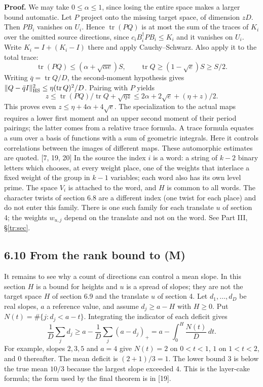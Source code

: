 \documentclass[11pt,letterpaper]{article}
\begin{document}
{\textbf{Proof.} We may take $0\le\alpha\le1$, since losing the entire space makes a larger bound automatic. Let $P$ project onto the missing target space, of dimension $zD$. Then $PB_i$ vanishes on $U_i$. Hence $\operatorname{tr}(PQ)$ is at most the sum of the traces of $K_i$ over the omitted source directions, since $c_iB_i^\dagger PB_i\le K_i$ and it vanishes on $U_i$. Write $K_i=I+(K_i-I)$ there and apply Cauchy--Schwarz. Also apply it to the total trace:
\begin{equation}\label{D:106}
 \operatorname{tr}(PQ)\le(\alpha+\sqrt{\alpha e})S,\qquad
 \operatorname{tr}Q\ge (1-\sqrt e)S\ge S/2 .
\end{equation}
Writing $\bar q=\operatorname{tr}Q/D$, the second-moment hypothesis gives $\|Q-\bar q I\|_{\rm HS}^2\le\eta(\operatorname{tr}Q)^2/D$. Pairing with $P$ yields
\begin{equation}\label{D:107}
 z\le\operatorname{tr}(PQ)/\operatorname{tr}Q+\sqrt{\eta z}
   \le 2\alpha+2\sqrt e+(\eta+z)/2.
\end{equation}
This proves even $z\le\eta+4\alpha+4\sqrt e$. The specialization to the actual maps requires a lower first moment and an upper second moment of their period pairings; the latter comes from a relative trace formula. A trace formula equates a sum over a basis of functions with a sum of geometric integrals. Here it controls correlations between the images of different maps. These automorphic estimates are quoted. [7, 19, 20] In the source the index $i$ is a word: a string of $k-2$ binary letters which chooses, at every weight place, one of the weights that interlace a fixed weight of the group in $k-1$ variables; each word also has its own level prime. The space $V_i$ is attached to the word, and $H$ is common to all words. The character twists of section 6.8 are a different index (one twist for each place) and do not enter this family. There is one such family for each translate $u$ of section 4; the weights $w_{u,j}$ depend on the translate and not on the word. See Part III, \S\ref{tr:sec}.

\newpage
\subsection*{6.10 From the rank bound to (M)}

It remains to see why a count of directions can control a mean slope. In this section $H$ is a bound for heights and $u$ is a spread of slopes; they are not the target space $H$ of section 6.9 and the translate $u$ of section 4. Let $d_1,\ldots,d_D$ be real slopes, $a$ a reference value, and assume $d_j\ge a-H$ with $H\ge0$. Put $N(t)=\#\{j:d_j<a-t\}$. Integrating the indicator of each deficit gives
\begin{equation}\label{D:108}
 \frac1D\sum_j d_j\ge a-\frac1D\sum_j(a-d_j)_+
     =a-\int_0^H \frac{N(t)}D\,dt .                              \tag{6.7}
\end{equation}
For example, slopes $2,3,5$ and $a=4$ give $N(t)=2$ on $0<t<1$, $1$ on $1<t<2$, and $0$ thereafter. The mean deficit is $(2+1)/3=1$. The lower bound $3$ is below the true mean $10/3$ because the largest slope exceeded $4$. This is the layer-cake formula; the form used by the final theorem is in [19].

}
\end{document}
